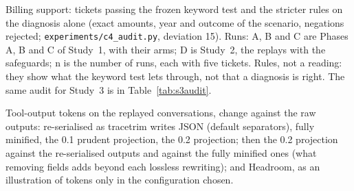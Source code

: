 \begin{table}[h]
\centering\small

\caption{Billing support: tickets passing the frozen keyword test and the stricter rules on the diagnosis alone
(exact amounts, year and outcome of the scenario, negations rejected; \texttt{experiments/c4\_audit.py}, deviation
15). Runs: A, B and C are Phases A, B and C of Study~1, with their arms; D is Study~2, the replays with the
safeguards; n is the number of runs, each with five tickets. Rules, not a reading: they show what the keyword test
lets through, not that a diagnosis is right. The same audit for Study~3 is in Table~\ref{tab:s3audit}.}
\label{tab:c4audit}
\end{table}

\begin{table}[h]
\centering\small
\resizebox{\textwidth}{!}{}
\caption{Tool-output tokens on the replayed conversations, change against the raw outputs: re-serialised as tracetrim
writes JSON (default separators), fully minified, the 0.1 prudent projection, the 0.2 projection; then the 0.2
projection against the re-serialised outputs and against the fully minified ones (what removing fields adds beyond
each lossless rewriting); and Headroom, as an illustration of tokens only in the configuration chosen.}
\label{tab:savingsdetail}
\end{table}

{\small

}
